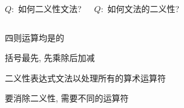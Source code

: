 \begin{frame}{}
  \begin{center}
  \end{center}

  \begin{columns}
      \begin{center}
        $Q:$ 如何二义性文法?

      \end{center}
      \begin{center}
        $Q:$ 如何文法的二义性?

      \end{center}
  \end{columns}
\end{frame}

\begin{frame}{}
  

  \vspace{0.30cm}
  \begin{center}
    四则运算均是的

    \vspace{0.30cm}
     括号最先, 先乘除后加减

    \vspace{0.80cm}
    二义性表达式文法以处理所有的算术运算符

    \vspace{0.30cm}
    要消除二义性, 需要不同的运算符

    \pause
    \vspace{0.80cm}
  \end{center}
\end{frame}

